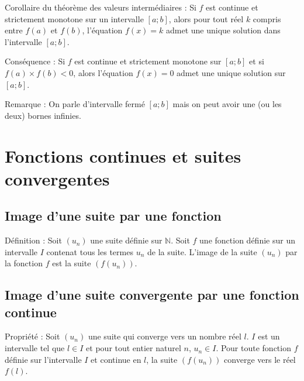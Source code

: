 \documentclass[11pt,a4paper]{article}
\begin{document}
\begin{boiteProp}{Corollaire du théorème des valeurs intermédiaires :}
    Si $f$ est continue et strictement monotone sur un intervalle $[a; b]$, alors pour tout réel $k$ compris entre $f(a)$ et $f(b)$, l'équation $f(x) = k$ admet une unique solution dans l'intervalle $[a; b]$.
\end{boiteProp}

\begin{boiteDef}{Conséquence :}
    Si $f$ est continue et strictement monotone sur $[a; b]$ et si $f(a) \times f(b) < 0$, alors l'équation $f(x) = 0$ admet une unique solution sur $[a; b]$.
\end{boiteDef}

\begin{boiteRemarque}{Remarque :}
    On parle d'intervalle fermé $[a; b]$ mais on peut avoir une (ou les deux) bornes infinies.
\end{boiteRemarque}

\section{Fonctions continues et suites convergentes}

\subsection{Image d'une suite par une fonction}

\begin{boiteDef}{Définition :}
    Soit $(u_n)$ une suite définie sur $\mathbb{N}$.
    \newline
    Soit $f$ une fonction définie sur un intervalle $I$ contenat tous les termes $u_n$ de la suite.
    \newline
    L'image de la suite $(u_n)$ par la fonction $f$ est la suite $(f(u_n))$.
\end{boiteDef}

\subsection{Image d'une suite convergente par une fonction continue}

\begin{boiteProp}{Propriété :}
    Soit $(u_n)$ une suite qui converge vers un nombre réel $l$.
    \newline
    $I$ est un intervalle tel que $l \in I$ et pour tout entier naturel $n$, $u_n \in I$.
    \newline
    Pour toute fonction $f$ définie sur l'intervalle $I$ et continue en $l$, la suite $(f(u_n))$ converge vers le réel $f(l)$.
\end{boiteProp}
\end{document}
